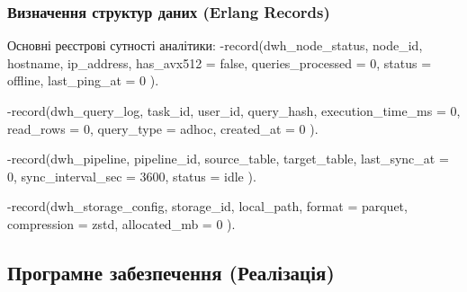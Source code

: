 \documentclass{article}
\let\originalfootnotesize\footnotesize
\let\oldverbatim\verbatim
\let\oldendverbatim\endverbatim
\renewenvironment{verbatim}{\originalfootnotesize\oldverbatim}{\oldendverbatim}
\begin{document}
\subsubsection{Визначення структур даних (Erlang Records)}
Основні реєстрові сутності аналітики:
\begin{verbatim}
-record(dwh_node_status, {
    node_id,                    % UUID вузла (PK)
    hostname,                   % Текстове ім'я хоста
    ip_address,                 % IP-адреса вузла
    has_avx512 = false,         % Наявність інструкцій AVX-512
    queries_processed = 0,      % Кількість виконаних запитів
    status = offline,           % online | offline | degraded
    last_ping_at = 0            % Timestamp пінгу
}).

-record(dwh_query_log, {
    task_id,                    % UUID задачі (PK)
    user_id,                    % UUID користувача
    query_hash,                 % SHA256 хеш SQL запиту
    execution_time_ms = 0,      % Час виконання
    read_rows = 0,              % Кількість зчитаних рядків
    query_type = adhoc,         % adhoc | report | sync
    created_at = 0
}).

-record(dwh_pipeline, {
    pipeline_id,                % UUID конвеєра (PK)
    source_table,               % Транзакційна таблиця Mnesia
    target_table,               % Аналітична таблиця DWH
    last_sync_at = 0,           % Час останньої синхронізації
    sync_interval_sec = 3600,   % Інтервал синхронізації
    status = idle               % idle | running | failed
}).

-record(dwh_storage_config, {
    storage_id,                 % UUID налаштування
    local_path,                 % Шлях до бази файлу (.db / .parquet)
    format = parquet,           % parquet | csv | native
    compression = zstd,         % zstd | lz4 | none
    allocated_mb = 0
}).
\end{verbatim}

\subsection{Програмне забезпечення (Реалізація)}
\end{document}
